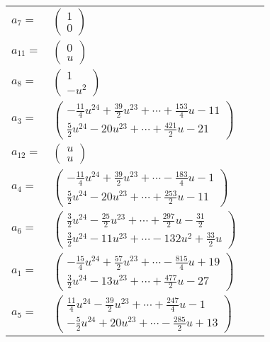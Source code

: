 \documentclass[1p]{elsarticle_modified}
\theoremstyle{definition}
\begin{document}
\begin{tabular}{m{7pt} m{180pt} m{7pt} m{180pt} }
\flushright $a_{7}=$&$\begin{pmatrix}1\\0\end{pmatrix}$ \\
\flushright $a_{11}=$&$\begin{pmatrix}0\\u\end{pmatrix}$ \\
\flushright $a_{8}=$&$\begin{pmatrix}1\\- u^2\end{pmatrix}$ \\
\flushright $a_{3}=$&$\begin{pmatrix}-\frac{11}{4} u^{24}+\frac{39}{2} u^{23}+\cdots+\frac{153}{4} u-11\\\frac{5}{2} u^{24}-20 u^{23}+\cdots+\frac{421}{2} u-21\end{pmatrix}$ \\
\flushright $a_{12}=$&$\begin{pmatrix}u\\u\end{pmatrix}$ \\
\flushright $a_{4}=$&$\begin{pmatrix}-\frac{11}{4} u^{24}+\frac{39}{2} u^{23}+\cdots-\frac{183}{4} u-1\\\frac{5}{2} u^{24}-20 u^{23}+\cdots+\frac{253}{2} u-11\end{pmatrix}$ \\
\flushright $a_{6}=$&$\begin{pmatrix}\frac{3}{2} u^{24}-\frac{25}{2} u^{23}+\cdots+\frac{297}{2} u-\frac{31}{2}\\\frac{3}{2} u^{24}-11 u^{23}+\cdots-132 u^2+\frac{33}{2} u\end{pmatrix}$ \\
\flushright $a_{1}=$&$\begin{pmatrix}-\frac{15}{4} u^{24}+\frac{57}{2} u^{23}+\cdots-\frac{815}{4} u+19\\\frac{3}{2} u^{24}-13 u^{23}+\cdots+\frac{477}{2} u-27\end{pmatrix}$ \\
\flushright $a_{5}=$&$\begin{pmatrix}\frac{11}{4} u^{24}-\frac{39}{2} u^{23}+\cdots+\frac{247}{4} u-1\\-\frac{5}{2} u^{24}+20 u^{23}+\cdots-\frac{285}{2} u+13\end{pmatrix}$ \\

\end{tabular}
\end{document}
